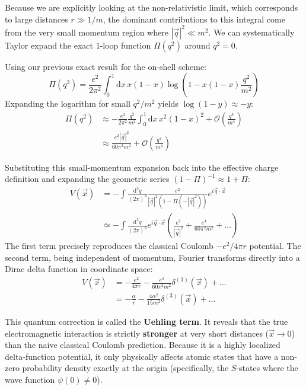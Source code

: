 Because we are explicitly looking at the non-relativistic limit, which corresponds to large distances $r \gg 1/m$, the dominant contributions to this integral come from the very small momentum region where $|\vec{q}|^2 \ll m^2$. We can systematically Taylor expand the exact 1-loop function $\Pi(q^2)$ around $q^2 = 0$.

Using our previous exact result for the on-shell scheme:
\[ \Pi(q^2) = \frac{e^2}{2\pi^2} \int_0^1 \mathrm{d}x \, x(1-x) \log\left(1 - x(1-x)\frac{q^2}{m^2}\right) \]
Expanding the logarithm for small $q^2/m^2$ yields $\log(1 - y) \approx -y$:
\[
    \begin{aligned}
        \Pi(q^2) & \approx -\frac{e^2}{2\pi^2} \frac{q^2}{m^2} \int_0^1 \mathrm{d}x \, x^2(1-x)^2 + \mathcal{O}\left(\frac{q^4}{m^4}\right) \\
                 & \approx \frac{e^2 |\vec{q}|^2}{60\pi^2 m^2} + \mathcal{O}\left(\frac{q^4}{m^4}\right)
    \end{aligned}
\]

Substituting this small-momentum expansion back into the effective charge definition and expanding the geometric series $(1-\Pi)^{-1} \approx 1 + \Pi$:
\[
    \begin{aligned}
        V(\vec{x}) & = -\int \frac{\mathrm{d}^3 q}{(2\pi)^3} \frac{e^2}{|\vec{q}|^2 (1 - \Pi(-|\vec{q}|^2))} e^{i \vec{q} \cdot \vec{x}}                               \\
                   & \simeq -\int \frac{\mathrm{d}^3 q}{(2\pi)^3} e^{i \vec{q} \cdot \vec{x}} \left( \frac{e^2}{|\vec{q}|^2} + \frac{e^4}{60\pi^2 m^2} + \dots \right)
    \end{aligned}
\]
The first term precisely reproduces the classical Coulomb $-e^2 / 4\pi r$ potential. The second term, being independent of momentum, Fourier transforms directly into a Dirac delta function in coordinate space:
\[
    \begin{aligned}
        V(\vec{x}) & = -\frac{e^2}{4\pi r} - \frac{e^4}{60\pi^2 m^2} \delta^{(3)}(\vec{x}) + \dots \\
                   & = -\frac{\alpha}{r} - \frac{4\alpha^2}{15 m^2} \delta^{(3)}(\vec{x}) + \dots
    \end{aligned}
\]

This quantum correction is called the \textbf{Uehling term}. It reveals that the true electromagnetic interaction is strictly \textbf{stronger} at very short distances ($\vec{x} \to 0$) than the naive classical Coulomb prediction. Because it is a highly localized delta-function potential, it only physically affects atomic states that have a non-zero probability density exactly at the origin (specifically, the $S$-states where the wave function $\psi(0) \neq 0$).

